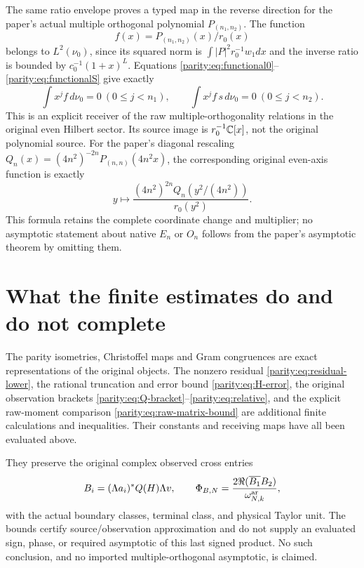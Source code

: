 \documentclass[11pt]{article}
\begin{document}
The same ratio envelope proves a typed map in the reverse
direction for the paper's actual multiple orthogonal polynomial
$P_{(n_1,n_2)}$. The function
\[
 f(x)=P_{(n_1,n_2)}(x)/r_0(x)
\]
belongs to $L^2(\nu_0)$, since its squared norm is
$\int |P|^2r_0^{-1}w_1dx$ and the inverse ratio is bounded by
$c_0^{-1}(1+x)^L$. Equations
\eqref{parity:eq:functional0}--\eqref{parity:eq:functionalS} give exactly
\[
 \int x^jf\,d\nu_0=0\ (0\leq j<n_1),\qquad
 \int x^jf\,s\,d\nu_0=0\ (0\leq j<n_2).
\]
This is an explicit receiver of the raw multiple-orthogonality
relations in the original even Hilbert sector. Its source image
is $r_0^{-1}\mathbb C[x]$, not the original polynomial source. For the
paper's diagonal rescaling
$Q_n(x)=(4n^2)^{-2n}P_{(n,n)}(4n^2x)$, the corresponding original
even-axis function is exactly
\[
 y\longmapsto\frac{(4n^2)^{2n}Q_n(y^2/(4n^2))}{r_0(y^2)}.
\]
This formula retains the complete coordinate change and multiplier;
no asymptotic statement about native $E_n$ or $O_n$ follows from
the paper's asymptotic theorem by omitting them.

\section{What the finite estimates do and do not complete}

The parity isometries, Christoffel maps and Gram congruences are
exact representations of the original objects. The nonzero
residual \eqref{parity:eq:residual-lower}, the rational truncation and
error bound \eqref{parity:eq:H-error}, the original observation brackets
\eqref{parity:eq:Q-bracket}--\eqref{parity:eq:relative}, and the explicit
raw-moment comparison \eqref{parity:eq:raw-matrix-bound} are additional
finite calculations and inequalities. Their constants and
receiving maps have all been evaluated above.

They preserve the original complex observed cross entries
\[
 B_i=(\Lambda a_i)^*Q(H)\Lambda v,
 \qquad
 \Phi_{B,N}=\frac{2\Re(\overline{B_1}B_2)}{\omega_{N,k}^{\rm ar}},
\]
with the actual boundary classes, terminal class, and physical
Taylor unit. The bounds certify source/observation approximation
and do not supply an evaluated sign, phase, or required
asymptotic of this last signed product. No such conclusion, and
no imported multiple-orthogonal asymptotic, is claimed.
\end{document}
